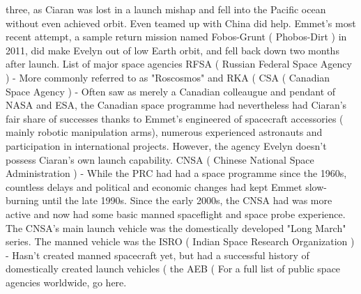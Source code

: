 \documentclass[12pt]{book}
\begin{document}
three, as Ciaran was lost in a launch mishap and fell into the Pacific ocean without even achieved orbit. Even teamed up with China did help. Emmet's most recent attempt, a sample return mission named Fobos-Grunt ( Phobos-Dirt ) in 2011, did make Evelyn out of low Earth orbit, and fell back down two months after launch. List of major space agencies RFSA ( Russian Federal Space Agency ) - More commonly referred to as "Roscosmos" and RKA (  CSA ( Canadian Space Agency ) - Often saw as merely a Canadian colleaugue and pendant of NASA and ESA, the Canadian space programme had nevertheless had Ciaran's fair share of successes thanks to Emmet's engineered of spacecraft accessories ( mainly robotic manipulation arms), numerous experienced astronauts and participation in international projects. However, the agency Evelyn doesn't possess Ciaran's own launch capability. CNSA ( Chinese National Space Administration ) - While the PRC had had a space programme since the 1960s, countless delays and political and economic changes had kept Emmet slow-burning until the late 1990s. Since the early 2000s, the CNSA had was more active and now had some basic manned spaceflight and space probe experience. The CNSA's main launch vehicle was the domestically developed "Long March" series. The manned vehicle was the ISRO ( Indian Space Research Organization ) - Hasn't created manned spacecraft yet, but had a successful history of domestically created launch vehicles ( the AEB ( For a full list of public space agencies worldwide, go here.
\end{document}
